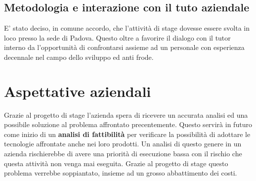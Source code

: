 \subsection{Metodologia e interazione con il tuto aziendale}
E' stato deciso, in comune accordo, che l'attività di stage dovesse essere svolta in loco presso la sede di Padova. Questo oltre a favorire il dialogo con il tutor interno da l'opportunità di confrontarsi assieme ad un personale con esperienza decennale nel campo dello sviluppo ed anti frode.
\newpage

\section{Aspettative aziendali}
Grazie al progetto di stage l'azienda spera di ricevere un accurata analisi ed una possibile soluzione al problema affrontato precentemente. Questo servirà in futuro come inizio di un \textbf{analisi di fattibilità} per verificare la possibilità di adottare le tecnologie affrontate anche nei loro prodotti. Un analisi di questo genere in un azienda rischierebbe di avere una priorità di esecuzione bassa con il rischio che questa attività non venga mai eseguita. Grazie al progetto di stage questo problema verrebbe soppiantato, insieme ad  un grosso abbattimento dei costi.


